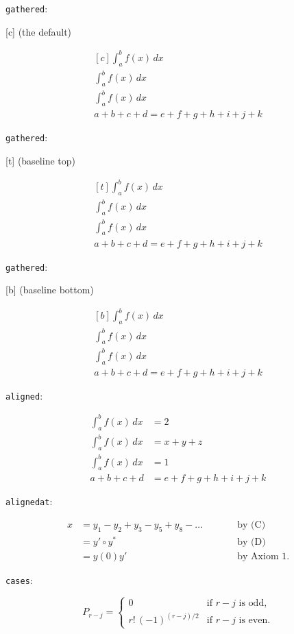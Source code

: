 \documentclass[leqno]{article}
\newcommand{\testtype}[2]{\texttt{#1}:%
  #2}
\newcommand{\makeoutertest}[3]{
  \begin{test}
    \testtype{#1}{#2}
    #3
  \end{test}
}
\begin{document}
\makeoutertest{gathered}{
  [c] (the default)
}{
  \begin{equation}
    \begin{gathered}[c]
      \int_a^b f(x)\, dx\\
      \int_a^b f(x)\, dx\\
      \int_a^b f(x)\, dx\\
      a+b+c+d = e+f+g+h+i+j+k
    \end{gathered}
  \end{equation}
}
\makeoutertest{gathered}{
  [t] (baseline top)
}{
  \begin{equation}
    \begin{gathered}[t]
      \int_a^b f(x)\, dx\\
      \int_a^b f(x)\, dx\\
      \int_a^b f(x)\, dx\\
      a+b+c+d = e+f+g+h+i+j+k
    \end{gathered}
  \end{equation}
}
\makeoutertest{gathered}{
  [b] (baseline bottom)
}{
  \begin{equation}
    \begin{gathered}[b]
      \int_a^b f(x)\, dx\\
      \int_a^b f(x)\, dx\\
      \int_a^b f(x)\, dx\\
      a+b+c+d = e+f+g+h+i+j+k
    \end{gathered}
  \end{equation}
}
\makeoutertest{aligned}{
}{
  \begin{equation}
      \begin{aligned}
      \int_a^b f(x)\, dx & = 2 \\
      \int_a^b f(x)\, dx & = x+y+z \\
      \int_a^b f(x)\, dx & = 1\\
      a+b+c+d & = e+f+g+h+i+j+k
      \end{aligned}
  \end{equation}
}
\makeoutertest{alignedat}{
}{
  \begin{equation}
    \begin{alignedat}{2}
      x& = y_1-y_2+y_3-y_5+y_8-\dots
      &\qquad& \text{by (C)}\\
       & = y'\circ y^* && \text{by (D)}\\
       & = y(0) y' && \text {by Axiom 1.}
    \end{alignedat}
  \end{equation}
}
\makeoutertest{cases}{
}{
  \begin{equation*}
    P_{r-j}=
    \begin{cases}
      0& \text{if $r-j$ is odd},\\
      r!\,(-1)^{(r-j)/2}& \text{if $r-j$ is even}.
    \end{cases}
  \end{equation*}
}
\end{document}
